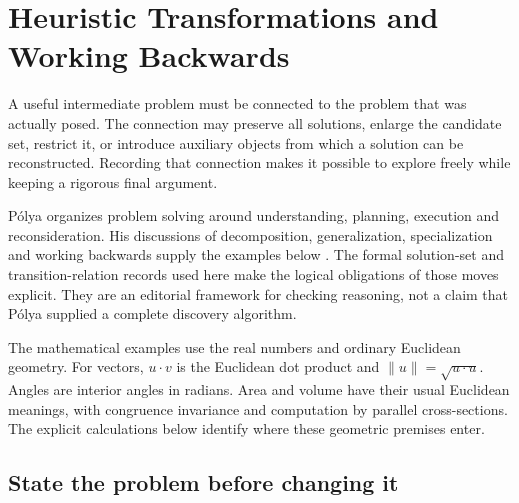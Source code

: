 \chapter{Heuristic Transformations and Working Backwards}
\label{sec:p12-heuristic-transformations-and-backward-reasoning}

A useful intermediate problem must be connected to the problem that
was actually posed. The connection may preserve all solutions, enlarge
the candidate set, restrict it, or introduce auxiliary objects from
which a solution can be reconstructed. Recording that connection makes
it possible to explore freely while keeping a rigorous final argument.

P\'olya organizes problem solving around understanding, planning,
execution and reconsideration. His discussions of decomposition,
generalization, specialization and working backwards supply the examples
below \cite[Part~I, secs.~6--14; Part~III, the corresponding dictionary
entries]{Polya2004HowToSolveItSelected}. The formal solution-set and
transition-relation records used here make the logical obligations of
those moves explicit. They are an editorial framework for checking
reasoning, not a claim that P\'olya supplied a complete discovery algorithm.

The mathematical examples use the real numbers and ordinary Euclidean
geometry. For vectors, \(u\cdot v\) is the Euclidean dot product and
\(\|u\|=\sqrt{u\cdot u}\). Angles are interior angles in radians.
Area and volume have their usual Euclidean meanings, with congruence
invariance and computation by parallel cross-sections. The explicit
calculations below identify where these geometric premises enter.

\section{State the problem before changing it}

